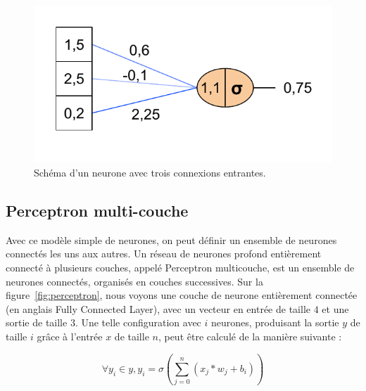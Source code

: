 \begin{figure}
\centering
\includegraphics[width=\columnwidth]{figures/1neuron.pdf}%
\caption{Schéma d'un neurone avec trois connexions entrantes.}%
\label{fig:1neuron}%
\end{figure}

\subsection{Perceptron multi-couche}

Avec ce modèle simple de neurones, on peut définir un ensemble de neurones connectés les uns aux autres.
Un réseau de neurones profond entièrement connecté à plusieurs couches, appelé Perceptron multicouche, est un ensemble de neurones connectés, organisés en couches successives. 
Sur la figure~\ref{fig:perceptron}, nous voyons une couche de neurone entièrement connectée (en anglais Fully Connected Layer), avec un vecteur en entrée de taille $4$ et une sortie de taille $3$.
Une telle configuration avec $i$ neurones, produisant la sortie $y$ de taille $i$ grâce à l'entrée $x$ de taille $n$, peut être calculé de la manière suivante :

\begin{equation}
	\forall y_i \in y, y_i = \sigma \left ( \sum_{j=0}^{n} (x_j*w_j + b_i) \right ) 
\label{eq:layer}
\end{equation}



